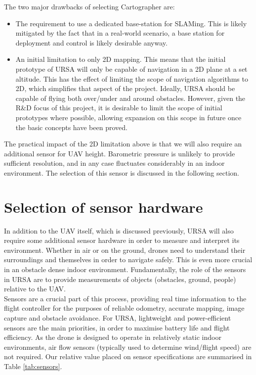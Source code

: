 \documentclass[capstone_report.tex]{subfiles}
\begin{document}
	The two major drawbacks of selecting Cartographer are:

	\begin{itemize}
	 	\item The requirement to use a dedicated base-station for SLAMing. This is likely mitigated by the fact that in a real-world scenario, a base station for deployment and control is likely desirable anyway.
	 	\item An initial limitation to only 2D mapping. This means that the initial prototype of URSA will only be capable of navigation in a 2D plane at a set altitude. This has the effect of limiting the scope of navigation algorithms to 2D, which simplifies that aspect of the project. Ideally, URSA should be capable of flying both over/under and around obstacles. However, given the R\&D focus of this project, it is desirable to limit the scope of initial prototypes where possible, allowing expansion on this scope in future once the basic concepts have been proved.
	\end{itemize}

	The practical impact of the 2D limitation above is that we will also require an additional sensor for UAV height. Barometric pressure is unlikely to provide sufficient resolution, and in any case fluctuates considerably in an indoor environment. The selection of this sensor is discussed in the following section. \\

\section{Selection of sensor hardware}
In addition to the UAV itself, which is discussed previously, URSA will also require some additional sensor hardware in order to measure and interpret its environment. Whether in air or on the ground, drones need to understand their surroundings and themselves in order to navigate safely. This is even more crucial in an obstacle dense indoor environment. Fundamentally, the role of the sensors in URSA are to provide measurements of objects (obstacles, ground, people) relative to the UAV.\\

Sensors are a crucial part of this process, providing real time information to the flight controller for the purposes of reliable odometry, accurate mapping, image capture and obstacle avoidance. For URSA, lightweight and power-efficient sensors are the main priorities, in order to maximise battery life and flight efficiency. As the drone is designed to operate in relatively static indoor environments, air flow sensors (typically used to determine wind/flight speed) are not required. Our relative value placed on sensor specifications are summarised in Table \ref{tab:sensors}.
\end{document}

